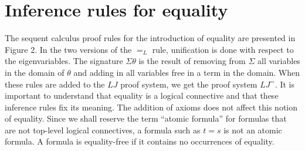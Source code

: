 \documentclass[10pt,a4paper]{article}
\newcommand{\pmLJ}{\mathit{LJ}}
\begin{document}
\section*{Inference rules for equality}
The sequent calculus proof rules for the introduction of equality are presented in Figure 2. In the two versions of the $=_L$ rule, unification is done with respect to the eigenvariables. The signature $\Sigma\theta$ is the result of removing from $\Sigma$ all variables in the domain of $\theta$ and adding in all variables free in a term in the domain. When these rules are added to the $\pmLJ$ proof system, we get the proof system $\pmLJ^=$. It is important to understand that equality is a logical connective and that these inference rules fix its meaning. The addition of axioms does not affect this notion of equality. Since we shall reserve the term ``atomic formula'' for formulas that are not top-level logical connectives, a formula such as $t=s$ is not an atomic formula.
A formula is equality-free if it contains no occurrences of equality.
\end{document}
